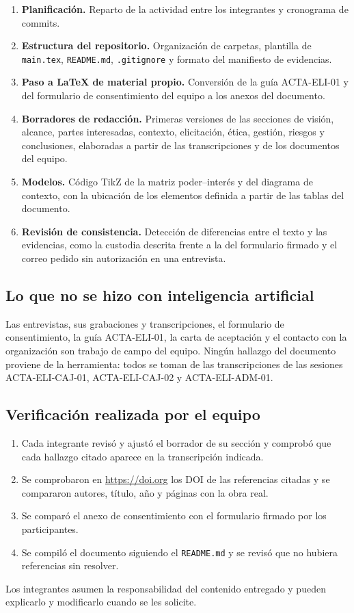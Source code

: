 \begin{enumerate}[label=\arabic*., leftmargin=*]
\item \textbf{Planificación.} Reparto de la actividad entre los integrantes y cronograma de commits.
\item \textbf{Estructura del repositorio.} Organización de carpetas, plantilla de \texttt{main.tex}, \texttt{README.md}, \texttt{.gitignore} y formato del manifiesto de evidencias.
\item \textbf{Paso a \LaTeX{} de material propio.} Conversión de la guía ACTA-ELI-01 y del formulario de consentimiento del equipo a los anexos del documento.
\item \textbf{Borradores de redacción.} Primeras versiones de las secciones de visión, alcance, partes interesadas, contexto, elicitación, ética, gestión, riesgos y conclusiones, elaboradas a partir de las transcripciones y de los documentos del equipo.
\item \textbf{Modelos.} Código TikZ de la matriz poder--interés y del diagrama de contexto, con la ubicación de los elementos definida a partir de las tablas del documento.
\item \textbf{Revisión de consistencia.} Detección de diferencias entre el texto y las evidencias, como la custodia descrita frente a la del formulario firmado y el correo pedido sin autorización en una entrevista.
\end{enumerate}

\subsection*{Lo que no se hizo con inteligencia artificial}

Las entrevistas, sus grabaciones y transcripciones, el formulario de consentimiento, la guía ACTA-ELI-01, la carta de aceptación y el contacto con la organización son trabajo de campo del equipo. Ningún hallazgo del documento proviene de la herramienta: todos se toman de las transcripciones de las sesiones ACTA-ELI-CAJ-01, ACTA-ELI-CAJ-02 y ACTA-ELI-ADM-01.

\subsection*{Verificación realizada por el equipo}

\begin{enumerate}[label=\arabic*., leftmargin=*]
\item Cada integrante revisó y ajustó el borrador de su sección y comprobó que cada hallazgo citado aparece en la transcripción indicada.
\item Se comprobaron en \url{https://doi.org} los DOI de las referencias citadas y se compararon autores, título, año y páginas con la obra real.
\item Se comparó el anexo de consentimiento con el formulario firmado por los participantes.
\item Se compiló el documento siguiendo el \texttt{README.md} y se revisó que no hubiera referencias sin resolver.
\end{enumerate}

Los integrantes asumen la responsabilidad del contenido entregado y pueden explicarlo y modificarlo cuando se les solicite.
